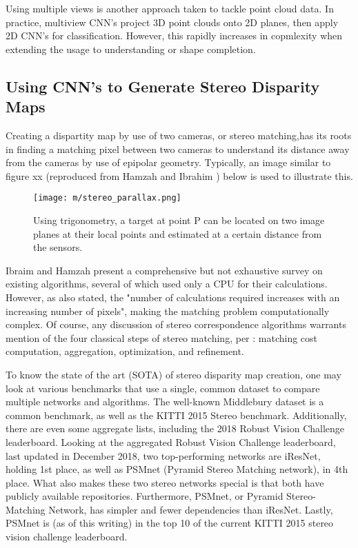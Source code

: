 Using multiple views is another approach taken to tackle point cloud data. In practice, multiview CNN's project 3D point clouds onto 2D planes, then apply 2D CNN's for classification. However, this rapidly increases in copmlexity when extending the usage to understanding or shape completion. 

\subsection{Using CNN's to Generate Stereo Disparity Maps}
Creating a dispartity map by use of two cameras, or stereo matching,has its roots in finding a matching pixel between two cameras to understand its distance away from the cameras by use of epipolar geometry. Typically, an image similar to figure xx (reproduced from Hamzah and Ibrahim \cite{hamzah_literature_2016}) below is used to illustrate this. 

\begin{figure}[h] %
    \centering
    \texttt{[image: m/stereo\_parallax.png]}
    \caption{Using trigonometry, a target at point P can be located on two image planes at their local points and estimated at a certain distance from the sensors.}
\end{figure}

Ibraim and Hamzah \cite{hamzah_literature_2016} present a comprehensive but not exhaustive survey on existing algorithms, several of which used only a CPU for their calculations. However, as also stated, the "number of calculations required increases with an increasing number of pixels", making the matching problem computationally complex. Of course, any discussion of stereo correspondence algorithms warrants mention of the four classical steps of stereo matching, per \cite{scharstein2002taxonomy}: matching cost computation, aggregation, optimization, and refinement.

To know the state of the art (SOTA) of stereo disparity map creation, one may look at various benchmarks that use a single, common dataset to compare multiple networks and algorithms. The well-known Middlebury \cite{scharstein2014high,middlebury_leaderboard} dataset is a common benchmark, as well as the KITTI \cite{geiger_are_2012,kitti_leaderboard} 2015 Stereo benchmark. Additionally, there are even some aggregate lists, including the 2018 Robust Vision Challenge \cite{rvc_leaderboard} leaderboard. Looking at the aggregated Robust Vision Challenge leaderboard, last updated in December 2018, two top-performing networks are iResNet, holding 1st place, as well as PSMnet (Pyramid Stereo Matching network), in 4th place. What also makes these two stereo networks special is that both have publicly available repositories. Furthermore, PSMnet, or Pyramid Stereo-Matching Network, has simpler and fewer dependencies than iResNet. Lastly, PSMnet is (as of this writing) in the top 10 of the current KITTI 2015 stereo vision challenge leaderboard. 

